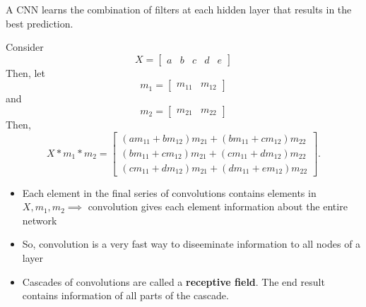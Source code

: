 \documentclass{article}
\begin{document}
A CNN learns the combination of filters at each hidden layer that results in the best prediction.

Consider
\[
    X = \begin{bmatrix}
        a & b & c & d & e
    \end{bmatrix}
\]
Then, let
\[
    m_1 = \begin{bmatrix}
        m_{11} & m_{12}
    \end{bmatrix}
\]
and
\[
    m_2 = \begin{bmatrix}
            m_{21} & m_{22}
        \end{bmatrix}
\]
Then, 
\[
    X * m_1 * m_2
    =
    \begin{bmatrix}
    (am_{11}+bm_{12})m_{21} + (bm_{11}+cm_{12})m_{22} \\[0.5em]
    (bm_{11}+cm_{12})m_{21} + (cm_{11}+dm_{12})m_{22} \\[0.5em]
    (cm_{11}+dm_{12})m_{21} + (dm_{11}+em_{12})m_{22}
    \end{bmatrix}.
\]
\begin{itemize}
    \item Each element in the final series of convolutions contains elements in $X, m_1, m_2 \implies$ convolution gives each element information about the entire network 
    \item So, convolution is a very fast way to diseeminate information to all nodes of a layer
    \item Cascades of convolutions are called a \textbf{receptive field}. The end result contains information of all parts of the cascade.
\end{itemize}
\end{document}
